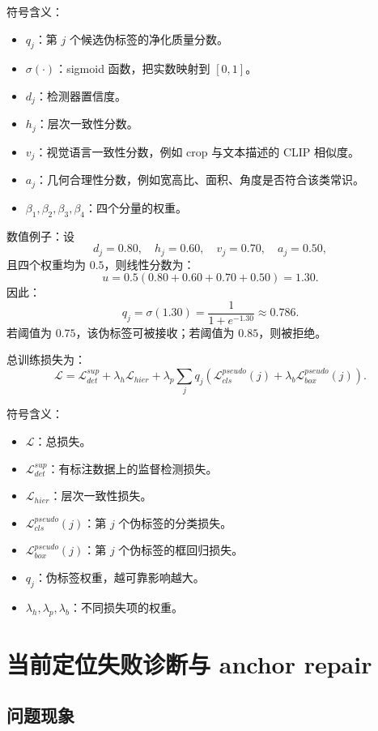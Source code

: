 \documentclass[11pt,a4paper]{ctexart}
\begin{document}
符号含义：
\begin{itemize}
  \item $q_j$：第 $j$ 个候选伪标签的净化质量分数。
  \item $\sigma(\cdot)$：sigmoid 函数，把实数映射到 $[0,1]$。
  \item $d_j$：检测器置信度。
  \item $h_j$：层次一致性分数。
  \item $v_j$：视觉语言一致性分数，例如 crop 与文本描述的 CLIP 相似度。
  \item $a_j$：几何合理性分数，例如宽高比、面积、角度是否符合该类常识。
  \item $\beta_1,\beta_2,\beta_3,\beta_4$：四个分量的权重。
\end{itemize}

数值例子：设
\[
d_j=0.80,\quad h_j=0.60,\quad v_j=0.70,\quad a_j=0.50,
\]
且四个权重均为 $0.5$，则线性分数为：
\[
u=0.5(0.80+0.60+0.70+0.50)=1.30.
\]
因此：
\[
q_j=\sigma(1.30)=\frac{1}{1+e^{-1.30}}\approx0.786.
\]
若阈值为 $0.75$，该伪标签可被接收；若阈值为 $0.85$，则被拒绝。

总训练损失为：
\[
\mathcal{L}
=\mathcal{L}^{sup}_{det}
+\lambda_h\mathcal{L}_{hier}
+\lambda_p\sum_j q_j
\left(\mathcal{L}^{pseudo}_{cls}(j)
+\lambda_b\mathcal{L}^{pseudo}_{box}(j)\right).
\]

符号含义：
\begin{itemize}
  \item $\mathcal{L}$：总损失。
  \item $\mathcal{L}^{sup}_{det}$：有标注数据上的监督检测损失。
  \item $\mathcal{L}_{hier}$：层次一致性损失。
  \item $\mathcal{L}^{pseudo}_{cls}(j)$：第 $j$ 个伪标签的分类损失。
  \item $\mathcal{L}^{pseudo}_{box}(j)$：第 $j$ 个伪标签的框回归损失。
  \item $q_j$：伪标签权重，越可靠影响越大。
  \item $\lambda_h,\lambda_p,\lambda_b$：不同损失项的权重。
\end{itemize}

\section{当前定位失败诊断与 anchor repair}

\subsection{问题现象}
\end{document}
